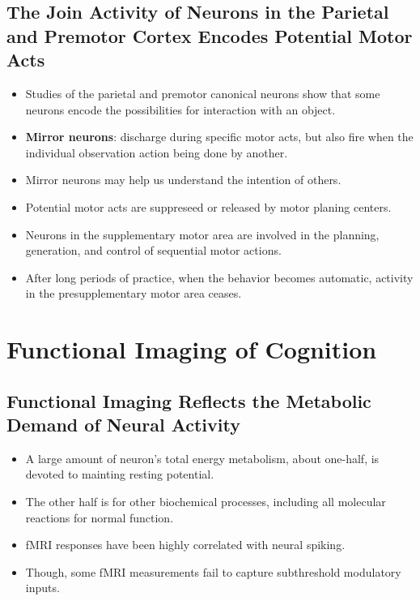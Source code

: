 \documentclass[12pt,a4paper]{article}
\begin{document}
\subsection{The Join Activity of Neurons in the Parietal and Premotor Cortex Encodes Potential Motor Acts}
\begin{itemize}
    \item Studies of the parietal and premotor canonical neurons show that some neurons encode the possibilities for interaction with an object.
    \item \textbf{Mirror neurons}: discharge during specific motor acts, but also fire when the individual observation action being done by another.
    \item Mirror neurons may help us understand the intention of others.
    \item Potential motor acts are suppreseed or released by motor planing centers.
    \item Neurons in the supplementary motor area are involved in the planning, generation, and control of sequential motor actions.
    \item After long periods of practice, when the behavior becomes automatic, activity in the presupplementary motor area ceases.
\end{itemize}

\clearpage
\section{Functional Imaging of Cognition}
\subsection{Functional Imaging Reflects the Metabolic Demand of Neural Activity}
\begin{itemize}
    \item A large amount of neuron's total energy metabolism, about one-half, is devoted to mainting resting potential.
    \item The other half is for other biochemical processes, including all molecular reactions for normal function.
    \item fMRI responses have been highly correlated with neural spiking.
    \item Though, some fMRI measurements fail to capture subthreshold modulatory inputs.
\end{itemize}
\end{document}
